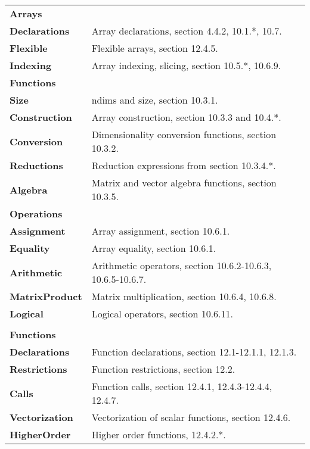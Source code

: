 \documentclass{article}
\begin{document}
\begin{tabular}{l l}
  \textbf{Arrays} \\
    \indent\textbf{Declarations}     & Array declarations, section 4.4.2, 10.1.*, 10.7. \\
    \indent\textbf{Flexible}         & Flexible arrays, section 12.4.5. \\
    \indent\textbf{Indexing}         & Array indexing, slicing, section 10.5.*, 10.6.9. \\
    \indent\textbf{Functions} \\
    \indent\indent\textbf{Size}      & ndims and size, section 10.3.1. \\
    \indent\indent\textbf{Construction} & Array construction, section 10.3.3 and 10.4.*. \\
    \indent\indent\textbf{Conversion}& Dimensionality conversion functions, section 10.3.2. \\
    \indent\indent\textbf{Reductions}& Reduction expressions from section 10.3.4.*. \\
    \indent\indent\textbf{Algebra}   & Matrix and vector algebra functions, section 10.3.5. \\
    \indent\textbf{Operations} \\
    \indent\indent\textbf{Assignment}& Array assignment, section 10.6.1. \\
    \indent\indent\textbf{Equality}  & Array equality, section 10.6.1. \\
    \indent\indent\textbf{Arithmetic}& Arithmetic operators, section 10.6.2-10.6.3, 10.6.5-10.6.7. \\
    \indent\indent\textbf{MatrixProduct}& Matrix multiplication, section 10.6.4, 10.6.8.  \\
    \indent\indent\textbf{Logical}   & Logical operators, section 10.6.11. \\
  \\
  \textbf{Functions} \\
    \indent\textbf{Declarations}     & Function declarations, section 12.1-12.1.1, 12.1.3. \\
    \indent\textbf{Restrictions}     & Function restrictions, section 12.2. \\
    \indent\textbf{Calls}            & Function calls, section 12.4.1, 12.4.3-12.4.4, 12.4.7. \\
    \indent\indent\textbf{Vectorization}& Vectorization of scalar functions, section 12.4.6. \\
    \indent\textbf{HigherOrder}      & Higher order functions, 12.4.2.*. \\

\end{tabular}
\end{document}

